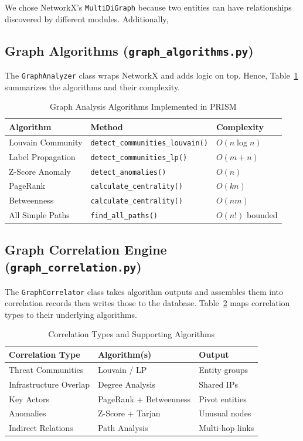 \documentclass[conference]{IEEEtran}
\begin{document}
We chose NetworkX's \texttt{MultiDiGraph} because two entities can have relationships discovered by different modules. Additionally,

\subsection{Graph Algorithms (\texttt{graph\_algorithms.py})}

The \texttt{GraphAnalyzer} class wraps NetworkX and adds logic on top. Hence, Table~\ref{tab:algorithms} summarizes the algorithms and their complexity.

\begin{table}[htbp]
\centering
\setlength{\tabcolsep}{1pt}
\caption{Graph Analysis Algorithms Implemented in PRISM}
\label{tab:algorithms}
\begin{tabular}{@{}lll@{}}
\toprule
\textbf{Algorithm} & \textbf{Method} & \textbf{Complexity} \\
\midrule
Louvain Community & \texttt{detect\_communities\_louvain()} & $O(n \log n)$ \\
Label Propagation & \texttt{detect\_communities\_lp()} & $O(m + n)$ \\
Z-Score Anomaly & \texttt{detect\_anomalies()} & $O(n)$ \\
PageRank & \texttt{calculate\_centrality()} & $O(kn)$ \\
Betweenness & \texttt{calculate\_centrality()} & $O(nm)$ \\
All Simple Paths & \texttt{find\_all\_paths()} & $O(n!)$ bounded \\
\bottomrule
\end{tabular}
\end{table}

\subsection{Graph Correlation Engine (\texttt{graph\_correlation.py})}

The \texttt{GraphCorrelator} class takes algorithm outputs and assembles them into correlation records then writes those to the database. Table~\ref{tab:correlations} maps correlation types to their underlying algorithms.

\begin{table}[htbp]
\centering
\caption{Correlation Types and Supporting Algorithms}
\label{tab:correlations}
\begin{tabular}{@{}lll@{}}
\toprule
\textbf{Correlation Type} & \textbf{Algorithm(s)} & \textbf{Output} \\
\midrule
Threat Communities & Louvain / LP & Entity groups \\
Infrastructure Overlap & Degree Analysis & Shared IPs \\
Key Actors & PageRank + Betweenness & Pivot entities \\
Anomalies & Z-Score + Tarjan & Unusual nodes \\
Indirect Relations & Path Analysis & Multi-hop links \\
\bottomrule
\end{tabular}
\end{table}
\end{document}
